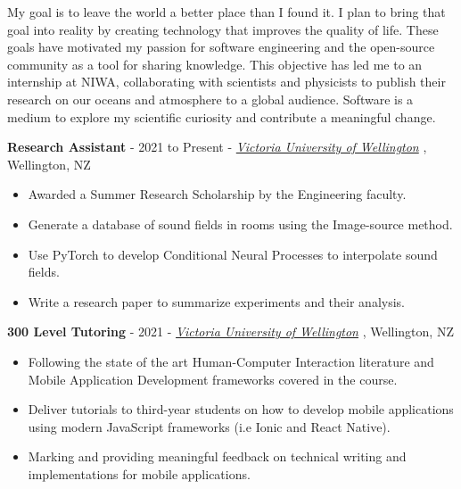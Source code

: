\documentclass[9pt]{developercv}
\begin{document}
My goal is to leave the world a better place than I found it. I plan to bring that goal into reality by creating technology that improves the quality of life. These goals have motivated my passion for software engineering and the open-source community as a tool for sharing knowledge. This objective has led me to an internship at NIWA, collaborating with scientists and physicists to publish their research on our oceans and atmosphere to a global audience. Software is a medium to explore my scientific curiosity and contribute a meaningful change.



\textbf{Research Assistant} - 2021 to Present - \emph{\href{https://www.wgtn.ac.nz/}{Victoria University of Wellington}} , Wellington, NZ
\begin{itemize}
    \item Awarded a Summer Research Scholarship by the Engineering faculty.
    \item Generate a database of sound fields in rooms using the Image-source method.  
    \item Use PyTorch to develop Conditional Neural Processes to interpolate sound fields.
    \item Write a research paper to summarize experiments and their analysis.
\end{itemize}

\textbf{300 Level Tutoring} - 2021 - \emph{\href{https://www.wgtn.ac.nz/}{Victoria University of Wellington}} , Wellington, NZ
\begin{itemize}
    \item Following the state of the art Human-Computer Interaction literature and Mobile Application Development frameworks covered in the course.
    \item Deliver tutorials to third-year students on how to develop mobile applications using modern JavaScript frameworks (i.e Ionic and React Native). 
    \item Marking and providing meaningful feedback on technical writing and implementations for mobile applications.
\end{itemize}
\end{document}

